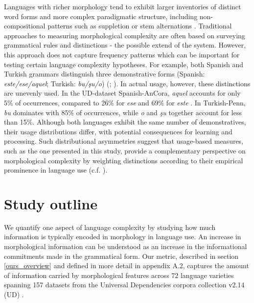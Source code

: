 \documentclass[USenglish]{article}
\begin{document}
Languages with richer morphology tend to exhibit larger inventories of distinct word forms and more complex paradigmatic structure, including non-compositional patterns such as suppletion or stem alternations \citep{baerman_understanding_2015, bentz2016comparison, dahl2004growth}. 
Traditional approaches to measuring morphological complexity are often based on surveying grammatical rules and distinctions \citep{lupyandale2010, shcherbakova2023societies} - the possible extend of the system. 
However, this approach does not capture frequency patterns which can be important for testing certain language complexity hypotheses. 
For example, both Spanish and Turkish grammars distinguish three demonstrative forms (Spanish: \emph{este/ese/aquel}; Turkish: \emph{bu/şu/o}) (\citet[87]{butt_new_2019}; \citet[67]{schaaik_oxford_2020}).
In actual usage, however, these distinctions are unevenly used. In the UD-dataset Spanish-AnCora, \emph{aquel} accounts for only 5\% of occurrences, compared to 26\% for \emph{ese} and 69\% for \emph{este} \citep{taule_ancora_2008}.
In Turkish-Penn, \emph{bu} dominates with 85\% of occurrences, while \emph{o} and \emph{şu} together account for less than 15\%. 
Although both languages exhibit the same number of demonstratives, their usage distributions differ, with potential consequences for learning and processing.
Such distributional asymmetries suggest that usage-based measures, such as the one presented in this study, provide a complementary perspective on morphological complexity by weighting distinctions according to their empirical prominence in language use (c.f. \citet{levshina_why_2023, bentz2016comparison}).

\FloatBarrier
\section{Study outline}\label{sec:studyOutline}
We quantify one aspect of language complexity by studying how much information is typically encoded in morphology in language use.
An increase in morphological information can be understood as an increase in the informational commitments made in the grammatical form. 
Our metric, described in section \ref{ours_overview} and defined in more detail in appendix A.2, %
captures the amount of information carried by morphological features across 72 language varieties spanning 157 datasets from the Universal Dependencies corpora collection v2.14 (UD) \citep{UD_2.14}.
\end{document}
